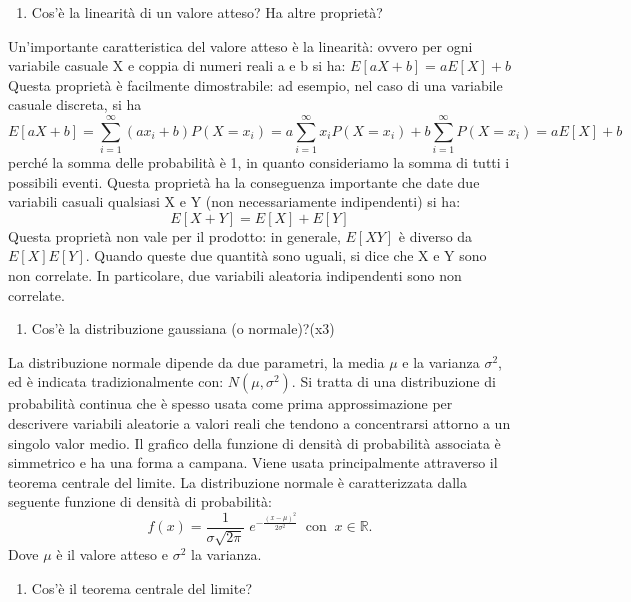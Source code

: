 \begin{enumerate}[resume]\bfseries
\item Cos'è la linearità di un valore atteso? Ha altre proprietà?
\end{enumerate}
Un'importante caratteristica del valore atteso è la linearità: ovvero per ogni variabile casuale X e coppia di numeri reali a e b si ha:
$E[aX+b]=aE[X]+b$
Questa proprietà è facilmente dimostrabile: ad esempio, nel caso di una variabile casuale discreta, si ha
\[ E[aX+b]=\sum_{i=1}^{\infty }(ax_{i}+b)P(X=x_{i})=a\sum_{i=1}^{\infty }x_{i}P(X=x_{i})+b\sum_{i=1}^{\infty }P(X=x_{i})=aE[X]+b  \]
perché la somma delle probabilità è 1, in quanto consideriamo la somma di tutti i possibili eventi.\newline
Questa proprietà ha la conseguenza importante che date due variabili casuali qualsiasi X e Y (non necessariamente indipendenti) si ha:
\[E[X+Y]= E[X]+ E[Y]\]
Questa proprietà non vale per il prodotto: in generale, $E[XY]$ è diverso da $E[X]E[Y]$. Quando queste due quantità sono uguali, si dice che X e Y sono non correlate. In particolare, due variabili aleatoria indipendenti sono non correlate.
\begin{enumerate}[resume]\bfseries
\item  Cos'è la distribuzione gaussiana (o normale)?(x3)
\end{enumerate}
La distribuzione normale dipende da due parametri, la media $\mu$ e la varianza $\sigma^2$, ed è indicata tradizionalmente con:\newline
$N(\mu ,\sigma ^{2}).$
Si tratta di una distribuzione di probabilità continua che è spesso usata come prima approssimazione per descrivere variabili aleatorie a valori reali che tendono a concentrarsi attorno a un singolo valor medio. Il grafico della funzione di densità di probabilità associata è simmetrico e ha una forma a campana.\newline
Viene usata principalmente attraverso il teorema centrale del limite. \newline
La distribuzione normale è caratterizzata dalla seguente funzione di densità di probabilità:
\[f(x)=\frac{1}{\sigma {\sqrt  {2\pi }}}\;e^{{-\frac  {\left(x-\mu \right)^{2}}{2\sigma ^{2}}}}~{\mbox{ con }}~x\in {\mathbb  {R}}.\]
Dove $\mu$  è il valore atteso e $\sigma^{2}$ la varianza.\newline
\begin{enumerate}[resume]\bfseries
	\item Cos'è il teorema centrale del limite?
\end{enumerate}

